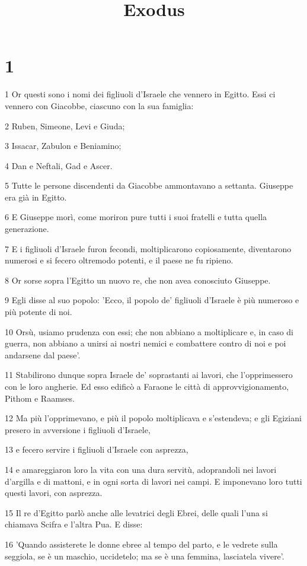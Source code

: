 

\title{Exodus}


\chapter{1}

\par 1 Or questi sono i nomi dei figliuoli d'Israele che vennero in Egitto. Essi ci vennero con Giacobbe, ciascuno con la sua famiglia:
\par 2 Ruben, Simeone, Levi e Giuda;
\par 3 Issacar, Zabulon e Beniamino;
\par 4 Dan e Neftali, Gad e Ascer.
\par 5 Tutte le persone discendenti da Giacobbe ammontavano a settanta. Giuseppe era già in Egitto.
\par 6 E Giuseppe morì, come moriron pure tutti i suoi fratelli e tutta quella generazione.
\par 7 E i figliuoli d'Israele furon fecondi, moltiplicarono copiosamente, diventarono numerosi e si fecero oltremodo potenti, e il paese ne fu ripieno.
\par 8 Or sorse sopra l'Egitto un nuovo re, che non avea conosciuto Giuseppe.
\par 9 Egli disse al suo popolo: 'Ecco, il popolo de' figliuoli d'Israele è più numeroso e più potente di noi.
\par 10 Orsù, usiamo prudenza con essi; che non abbiano a moltiplicare e, in caso di guerra, non abbiano a unirsi ai nostri nemici e combattere contro di noi e poi andarsene dal paese'.
\par 11 Stabilirono dunque sopra Israele de' soprastanti ai lavori, che l'opprimessero con le loro angherie. Ed esso edificò a Faraone le città di approvvigionamento, Pithom e Raamses.
\par 12 Ma più l'opprimevano, e più il popolo moltiplicava e s'estendeva; e gli Egiziani presero in avversione i figliuoli d'Israele,
\par 13 e fecero servire i figliuoli d'Israele con asprezza,
\par 14 e amareggiaron loro la vita con una dura servitù, adoprandoli nei lavori d'argilla e di mattoni, e in ogni sorta di lavori nei campi. E imponevano loro tutti questi lavori, con asprezza.
\par 15 Il re d'Egitto parlò anche alle levatrici degli Ebrei, delle quali l'una si chiamava Scifra e l'altra Pua. E disse:
\par 16 'Quando assisterete le donne ebree al tempo del parto, e le vedrete sulla seggiola, se è un maschio, uccidetelo; ma se è una femmina, lasciatela vivere'.
